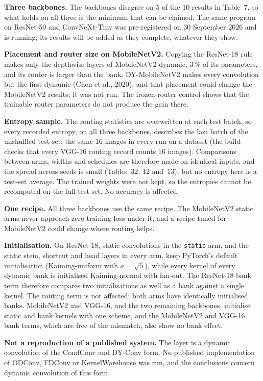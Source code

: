 \documentclass{article}
\begin{document}
\textbf{Three backbones.}  The backbones disagree on 5 of the
10 results in Table~7, so what holds on all three
is the minimum that can be claimed. The same program on ResNet-50 and
ConvNeXt-Tiny was pre-registered on 30 September 2026 and is running; its
results will be added as they complete, whatever they show.

\textbf{Placement and router size on MobileNetV2.}  Copying the
ResNet-18 rule makes only the depthwise layers of MobileNetV2 dynamic,
3\,\% of its parameters, and its router is larger than the
bank. DY-MobileNetV2 makes every convolution but the first dynamic
(Chen et al., 2020), and that placement could change the MobileNetV2
results; it was not run. The frozen-router control
shows that the trainable router parameters do not produce the gain there.

\textbf{Entropy sample.}  The routing statistics are overwritten at each
test batch, so every recorded entropy, on all three backbones, describes
the last batch of the unshuffled test set: the same 16 images in every run
on a dataset (the build checks that every VGG-16 routing record counts 16
images). Comparisons between arms, widths and schedules are therefore made
on identical inputs, and the spread across seeds is small
(Tables~32, 12 and~13), but no
entropy here is a test-set average. The trained weights were not kept, so
the entropies cannot be recomputed on the full test set. No accuracy is
affected.

\textbf{One recipe.}  All three backbones use the same recipe. The
MobileNetV2 static arms never approach zero training loss under it, and a
recipe tuned for MobileNetV2 could change where routing helps.

\textbf{Initialisation.}  On ResNet-18, static convolutions in the
\texttt{static} arm, and the static stem, shortcut and head layers in
every arm, keep PyTorch's default initialisation (Kaiming-uniform with
$a=\sqrt5$), while every kernel of every dynamic bank is initialised
Kaiming-normal with fan-out. The ResNet-18 bank term therefore compares
two initialisations as well as a bank against a single kernel. The routing
term is not affected: both arms have identically initialised banks.
MobileNetV2 and VGG-16, and the two remaining backbones, initialise static
and bank kernels with one scheme, and the MobileNetV2 and VGG-16 bank
terms, which are free of the mismatch, also show no bank effect.

\textbf{Not a reproduction of a published system.}  The layer is a
dynamic convolution of the CondConv and DY-Conv form. No published
implementation of ODConv, FDConv or KernelWarehouse was run, and the
conclusions concern dynamic convolution of this form.
\end{document}
